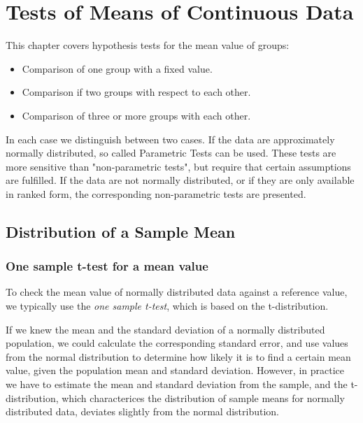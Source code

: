 \chapter{Tests of Means of Continuous Data}

This chapter covers hypothesis tests for the mean value of groups:

\begin{itemize}
  \item Comparison of one group with a fixed value.
  \item Comparison if two groups with respect to each other.
  \item Comparison of three or more groups with each other.
\end{itemize}

In each case we distinguish between two cases. If the data are approximately normally distributed, so called Parametric Tests can be used. These tests are more sensitive than "non-parametric tests", but require that certain assumptions are fulfilled. If the data are not normally distributed, or if they are only available in ranked form, the corresponding non-parametric tests are presented.

\section{Distribution of a Sample Mean}

\subsection{One sample t-test for a mean value} 

To check the mean value of normally distributed data against a reference value, we typically use the \emph{one sample t-test}, which is based on the t-distribution.

If we knew the mean and the standard deviation of a normally distributed population, we could calculate the corresponding standard error, and use values from the normal distribution to determine how likely it is to find a certain mean value, given the population mean and standard deviation. However, in practice we have to estimate the mean and standard deviation from the sample, and the t-distribution, which characterices the distribution of sample means for normally distributed data, deviates slightly from the normal distribution.

